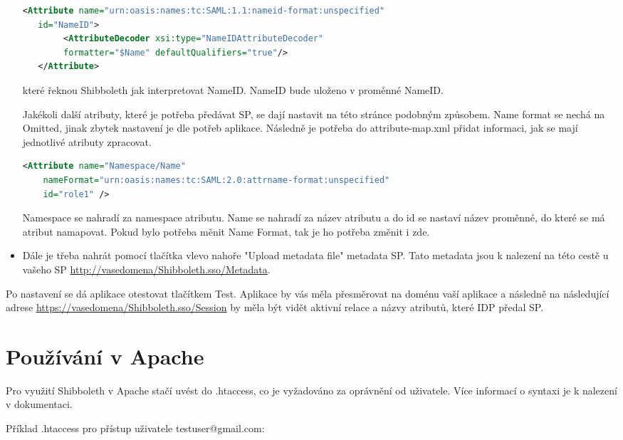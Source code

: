 \begin{itemize}
\begin{lstlisting}[language=XML]
   <Attribute name="urn:oasis:names:tc:SAML:1.1:nameid-format:unspecified"
   id="NameID">
        <AttributeDecoder xsi:type="NameIDAttributeDecoder" 
        formatter="$Name" defaultQualifiers="true"/>
   </Attribute>
\end{lstlisting}
které řeknou Shibboleth jak interpretovat NameID. NameID bude uloženo v proměnné NameID.

Jakékoli další atributy, které je potřeba předávat SP, se dají nastavit na této stránce podobným způsobem. Name format se nechá na Omitted, jinak zbytek nastavení je dle potřeb aplikace. Následně je potřeba do attribute-map.xml přidat informaci, jak se mají jednotlivé atributy zpracovat.
   \begin{lstlisting}[language=XML]
     <Attribute name="Namespace/Name"
    nameFormat="urn:oasis:names:tc:SAML:2.0:attrname-format:unspecified"
    id="role1" />
    \end{lstlisting}
Namespace se nahradí za namespace atributu. Name se nahradí za název atributu a do id se nastaví název proměnné, do které se má atribut namapovat. Pokud bylo potřeba měnit Name Format, tak je ho potřeba změnit i zde.\cite{AddAttribute}
    


    \item Dále je třeba nahrát pomocí tlačítka vlevo nahoře "Upload metadata file" metadata SP. Tato metadata jsou k nalezení na této cestě u vašeho SP \url{http://vasedomena/Shibboleth.sso/Metadata}.

\end{itemize}

Po nastavení se dá aplikace otestovat tlačítkem Test. Aplikace by vás měla přesměrovat na doménu vaší aplikace a následně na následující adrese \url{https://vasedomena/Shibboleth.sso/Session} by měla být vidět aktivní relace a názvy atributů, které IDP předal SP.

\section{Používání v Apache}

Pro využití Shibboleth v Apache stačí uvést do .htaccess, co je vyžadováno za oprávnění od uživatele. Více informací o syntaxi je k nalezení v dokumentaci\cite{SPApache}\cite{SPhtaccess}. \linebreak

Příklad .htaccess pro přístup uživatele testuser@gmail.com:

